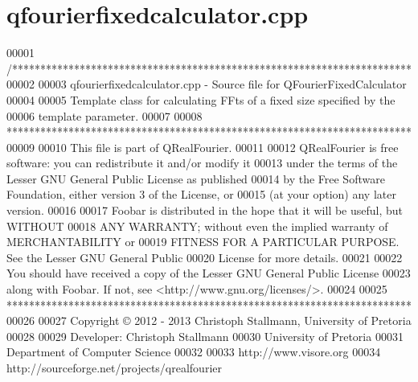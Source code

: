 \hypertarget{a00119_source}{\section{qfourierfixedcalculator.\+cpp}
\label{a00119_source}
}

\begin{DoxyCode}
00001 \textcolor{comment}{/***********************************************************************}
00002 \textcolor{comment}{}
00003 \textcolor{comment}{qfourierfixedcalculator.cpp - Source file for QFourierFixedCalculator}
00004 \textcolor{comment}{}
00005 \textcolor{comment}{Template class for calculating FFts of a fixed size specified by the}
00006 \textcolor{comment}{template parameter.}
00007 \textcolor{comment}{}
00008 \textcolor{comment}{************************************************************************}
00009 \textcolor{comment}{}
00010 \textcolor{comment}{This file is part of QRealFourier.}
00011 \textcolor{comment}{}
00012 \textcolor{comment}{QRealFourier is free software: you can redistribute it and/or modify it}
00013 \textcolor{comment}{under the terms of the Lesser GNU General Public License as published}
00014 \textcolor{comment}{by the Free Software Foundation, either version 3 of the License, or}
00015 \textcolor{comment}{(at your option) any later version.}
00016 \textcolor{comment}{}
00017 \textcolor{comment}{Foobar is distributed in the hope that it will be useful, but WITHOUT}
00018 \textcolor{comment}{ANY WARRANTY; without even the implied warranty of MERCHANTABILITY or}
00019 \textcolor{comment}{FITNESS FOR A PARTICULAR PURPOSE.  See the Lesser GNU General Public}
00020 \textcolor{comment}{License for more details.}
00021 \textcolor{comment}{}
00022 \textcolor{comment}{You should have received a copy of the Lesser GNU General Public License}
00023 \textcolor{comment}{along with Foobar.  If not, see <http://www.gnu.org/licenses/>.}
00024 \textcolor{comment}{}
00025 \textcolor{comment}{************************************************************************}
00026 \textcolor{comment}{}
00027 \textcolor{comment}{Copyright © 2012 - 2013 Christoph Stallmann, University of Pretoria}
00028 \textcolor{comment}{}
00029 \textcolor{comment}{Developer: Christoph Stallmann}
00030 \textcolor{comment}{University of Pretoria}
00031 \textcolor{comment}{Department of Computer Science}
00032 \textcolor{comment}{}
00033 \textcolor{comment}{http://www.visore.org}
00034 \textcolor{comment}{http://sourceforge.net/projects/qrealfourier}

\end{DoxyCode}

